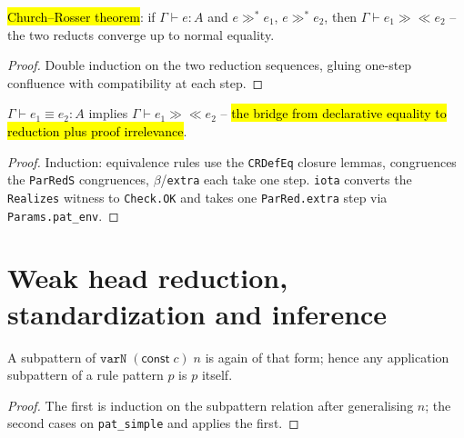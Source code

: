 \begin{theorem}
\label{thm:parreds-church-rosser}
\leanok
{}

 \hl{Church--Rosser theorem}: if $\Gamma\vdash e:A$ and $e\gg^* e_1$,
$e\gg^* e_2$, then $\Gamma\vdash e_1\gg\ll e_2$ -- the two reducts converge up to normal
equality. \stTainted{}
\end{theorem}
\begin{proof}
\leanok
{} Double induction on the two reduction sequences, gluing one-step confluence with
compatibility at each step.
\end{proof}

\begin{theorem}
\label{thm:isdefeq-church-rosser}
\leanok
{}

 $\Gamma\vdash e_1\equiv e_2:A$ implies $\Gamma\vdash e_1\gg\ll e_2$ -- \hl{the
bridge from declarative equality to reduction plus proof irrelevance}.
\end{theorem}
\begin{proof}
\leanok
{} Induction: equivalence rules use the \texttt{CRDefEq} closure lemmas, congruences
the \texttt{ParRedS} congruences, $\beta$/\texttt{extra} each take one step. \texttt{iota}
converts the \texttt{Realizes} witness to \texttt{Check.OK} and takes one
\texttt{ParRed.extra} step via \texttt{Params.pat\_env}.
\end{proof}

\section{Weak head reduction, standardization and inference}

\begin{lemma}
\label{fam:hr-pattern-shape}
\leanok
{}

 A subpattern of $\mathtt{varN}\;(\mathsf{const}\;c)\;n$ is again of that form;
hence any application subpattern of a rule pattern $p$ is $p$ itself.
\end{lemma}
\begin{proof}
\leanok
{} The first is induction on the subpattern relation after generalising $n$; the
second cases on \texttt{pat\_simple} and applies the first.
\end{proof}

